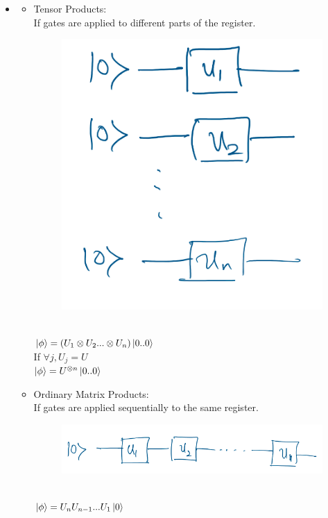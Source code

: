 \documentclass[11.5pt, paper=a4]{article}
\theoremstyle{definition}
\numberwithin{theorem}{section}
\begin{document}
\begin{itemize}
    \item
        \begin{itemize}
            \item Tensor Products: \\
                If gates are applied to different parts of the register.
                \begin{figure}[h]
                    \centering
                    \includegraphics[scale=0.2]{images/Tensor Product.png}
                \end{figure}\\
                $\ket{\phi} = (U_{1}\otimes U_{2}...\otimes U_{n})\ket{0..0}$\\
                If $\forall j, U_{j}=U$\\
                $\ket{\phi} =   U^{\otimes n}\ket{0..0}$
            \item Ordinary Matrix Products: \\
                If gates are applied sequentially to the same register.
                \begin{figure}[h]
                    \centering
                    \includegraphics[scale=0.2]{images/Tensor Product2.png}
                \end{figure}\\
                $\ket{\phi}=U_{n} U_{n-1} ... U_{1}\ket{0}$
        \end{itemize}
        

\end{itemize}
\end{document}
